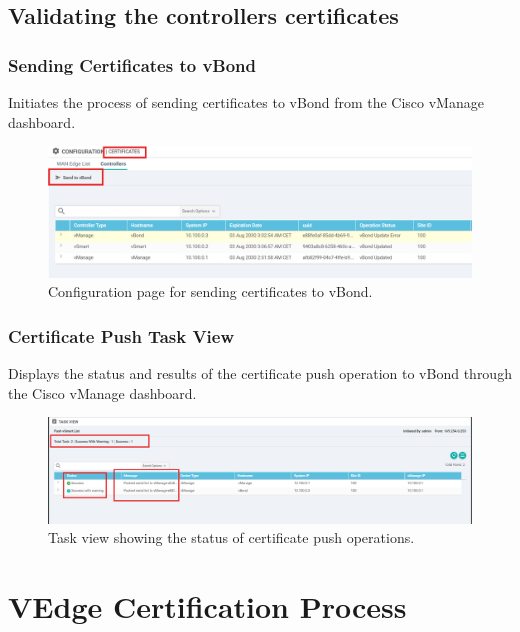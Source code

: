 \documentclass[12pt,english]{report}
\begin{document}
\subsection{Validating the controllers certificates}
\subsubsection{Sending Certificates to vBond}

Initiates the process of sending certificates to vBond from the Cisco vManage dashboard.

\begin{figure}[H]
    \centering
    \includegraphics[width=1\textwidth]{appendix/push-cert-controllers1.png}
    \caption{Configuration page for sending certificates to vBond.}
    \label{fig:send-to-vbond}
\end{figure}

\subsubsection{Certificate Push Task View}
Displays the status and results of the certificate push operation to vBond through the Cisco vManage dashboard.

\begin{figure}[H]
    \centering
    \includegraphics[width=1\textwidth]{appendix/push-cert-controllers2.png}
    \caption{Task view showing the status of certificate push operations.}
    \label{fig:certificate-push-task-view}
\end{figure}

\section{VEdge Certification Process}
\end{document}
